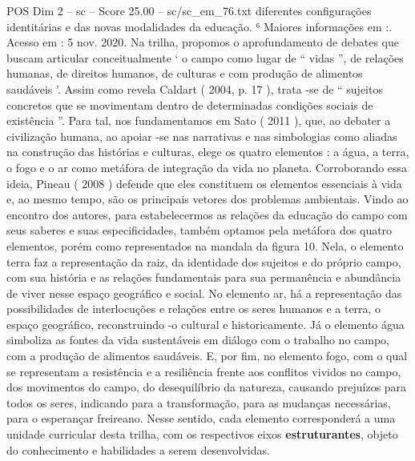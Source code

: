\begin{textsample}{POS Dim 2 – sc – Score 25.00 – sc/sc\_em\_76.txt}
diferentes configurações identitárias e das novas modalidades da educação. ⁶ Maiores informações em :.
Acesso em : 5 nov. 2020.
Na trilha, propomos o aprofundamento de debates que buscam articular conceitualmente ‘ o campo como lugar de “ vidas ”, de relações humanas, de direitos humanos, de culturas e com produção de alimentos saudáveis ’.
Assim como revela Caldart ( 2004, p. 17 ), trata -se de “ sujeitos concretos que se movimentam dentro de determinadas condições sociais de existência ”.
Para tal, nos fundamentamos em Sato ( 2011 ), que, ao debater a civilização humana, ao apoiar -se nas narrativas e nas simbologias como aliadas na construção das histórias e culturas, elege os quatro elementos : a água, a terra, o fogo e o ar como metáfora de integração da vida no planeta.
Corroborando essa ideia, Pineau ( 2008 ) defende que eles constituem os elementos essenciais à vida e, ao mesmo tempo, são os principais vetores dos problemas ambientais.
Vindo ao encontro dos autores, para estabelecermos as relações da educação do campo com seus saberes e suas especificidades, também optamos pela metáfora dos quatro elementos, porém como representados na mandala da figura 10.
Nela, o elemento terra faz a representação da raiz, da identidade dos sujeitos e do próprio campo, com sua história e as relações fundamentais para sua permanência e abundância de viver nesse espaço geográfico e social.
No elemento ar, há a representação das possibilidades de interlocuções e relações entre os seres humanos e a terra, o espaço geográfico, reconstruindo -o cultural e historicamente.
Já o elemento água simboliza as fontes da vida sustentáveis em diálogo com o trabalho no campo, com a produção de alimentos saudáveis.
E, por fim, no elemento fogo, com o qual se representam a resistência e a resiliência frente aos conflitos vividos no campo, dos movimentos do campo, do desequilíbrio da natureza, causando prejuízos para todos os seres, indicando para a transformação, para as mudanças necessárias, para o esperançar freireano.
Nesse sentido, cada elemento corresponderá a uma unidade curricular desta trilha, com os respectivos eixos \textbf{estruturantes}, objeto do conhecimento e habilidades a serem desenvolvidas.

\end{textsample}
